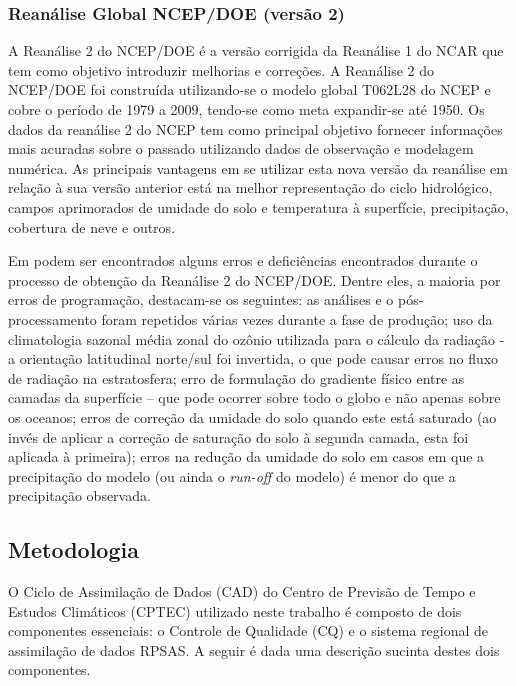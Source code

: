 \subsubsection{Reanálise Global NCEP/DOE (versão 2)}

A Reanálise 2 do NCEP/DOE \cite{kanamitsuetal02} é a versão corrigida da Reanálise 1 do NCAR \cite{kalnayetal96} que tem como objetivo introduzir melhorias e correções. A Reanálise 2 do NCEP/DOE foi construída utilizando-se o modelo global T062L28 do NCEP e cobre o período de 1979 a 2009, tendo-se como meta expandir-se até 1950. Os dados da reanálise 2 do NCEP tem como principal objetivo fornecer informações mais acuradas sobre o passado utilizando dados de observação e modelagem numérica. As principais vantagens em se utilizar esta nova versão da reanálise em relação à sua versão anterior está na melhor representação do ciclo hidrológico, campos aprimorados de umidade do solo e temperatura à superfície, precipitação, cobertura de neve e outros.

Em  podem ser encontrados alguns erros e deficiências encontrados durante o processo de obtenção da Reanálise 2 do NCEP/DOE. Dentre eles, a maioria por erros de programação, destacam-se os seguintes: as análises e o pós-processamento foram repetidos várias vezes durante a fase de produção; uso da climatologia sazonal média zonal do ozônio utilizada para o cálculo da radiação - a orientação latitudinal norte/sul foi invertida, o que pode causar erros no fluxo de radiação na estratosfera; erro de formulação do gradiente físico entre as camadas da superfície – que pode ocorrer sobre todo o globo e não apenas sobre os oceanos; erros de correção da umidade do solo quando este está saturado (ao invés de aplicar a correção de saturação do solo à segunda camada, esta foi aplicada à primeira); erros na redução da umidade do solo em casos em que a precipitação do modelo (ou ainda o \textit{run-off} do modelo) é menor do que a precipitação observada.

\subsection{Metodologia}

O Ciclo de Assimilação de Dados (CAD) do Centro de Previsão de Tempo e Estudos Climáticos (CPTEC) utilizado neste trabalho é composto de dois  componentes essenciais: o Controle de Qualidade (CQ) e o sistema regional de assimilação de dados RPSAS. A seguir é dada uma descrição sucinta destes dois componentes.

